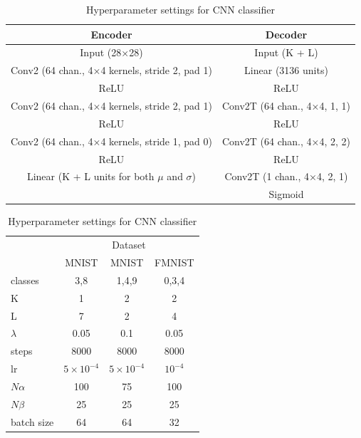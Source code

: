 \begin{table}[h]
	\caption{GCE network architecture used for MNIST and fMNIST experiments}\label{tab:gce_architecture}
	\begin{tabular}{|c|c|}
		\toprule[1.5pt]
		Encoder & Decoder\\
		\hline
		Input (28×28) & Input (K + L)\\
		Conv2 (64 chan., 4×4 kernels, stride 2, pad 1) & Linear (3136 units)\\
		ReLU& ReLU\\
		Conv2 (64 chan., 4×4 kernels, stride 2, pad 1) & Conv2T (64 chan., 4×4, 1, 1)\\
		ReLU& ReLU\\
		Conv2 (64 chan., 4×4 kernels, stride 1, pad 0) & Conv2T (64 chan., 4×4, 2, 2)\\
		ReLU& ReLU\\
		Linear (K + L units for both $\mu$ and $\sigma$)& Conv2T (1 chan., 4×4, 2, 1)\\
		& Sigmoid\\
		\hline
	\end{tabular}
	\begin{minipage}{0.45\linewidth}
		\centering
		\caption{Hyperparameter settings for GCE models}\label{tab:hyperparameter_gce}
		\begin{tabular}{l |c c c}
			\toprule
			\multicolumn{1}{c}{} & \multicolumn{3}{|c}{Dataset}\\
			\cline{2-4}
			\multicolumn{1}{c}{}&\multicolumn{1}{|c}{MNIST}  & \multicolumn{1}{c}{MNIST}  & \multicolumn{1}{c}{FMNIST} \\
			\midrule
			{\tiny classes} & 3,8 & 1,4,9 & 0,3,4\\ 
			K & 1 &  2  &2  \\
			L & 7& 2 & 4\\
			$\lambda$  & 0.05 & 0.1 & 0.05\\
			steps & 8000 & 8000 & 8000\\
			lr & $5 \times 10^{-4}$ & $5 \times 10^{-4}$ & $10^{-4}$\\
			$N\alpha$ & 100 & 75 & 100\\
			$N\beta$ &  25 & 25 & 25\\
			{\tiny batch size} &  64 & 64 & 32\\
			\bottomrule
		\end{tabular}
	\end{minipage}
	\hspace{1cm}
	\begin{minipage}{0.45\linewidth}
		\centering
		\caption{Hyperparameter settings for CNN classifier}\label{tab:hyperparameter_cnn}

\end{minipage}
\end{table}
